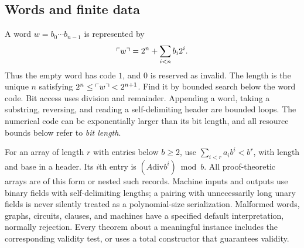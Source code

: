 \subsection{Words and finite data}
A word $w=b_0\cdots b_{n-1}$ is represented by
\[
 \ulcorner w\urcorner=2^n+\sum_{i<n}b_i2^i.
\]
Thus the empty word has code $1$, and $0$ is reserved as invalid. The length is the unique $n$ satisfying $2^n\le\ulcorner w\urcorner<2^{n+1}$. Find it by bounded search below the word code. Bit access uses division and remainder. Appending a word, taking a substring, reversing, and reading a self-delimiting header are bounded loops. The numerical code can be exponentially larger than its bit length, and all resource bounds below refer to \emph{bit length}.

For an array of length $r$ with entries below $b\ge2$, use $\sum_{i<r}a_i b^i<b^r$, with length and base in a header. Its $i$th entry is $(A\mathbin{\mathrm{div}}b^i)\bmod b$. All proof-theoretic arrays are of this form or nested such records. Machine inputs and outputs use binary fields with self-delimiting lengths; a pairing with unnecessarily long unary fields is never silently treated as a polynomial-size serialization. Malformed words, graphs, circuits, clauses, and machines have a specified default interpretation, normally rejection. Every theorem about a meaningful instance includes the corresponding validity test, or uses a total constructor that guarantees validity.

